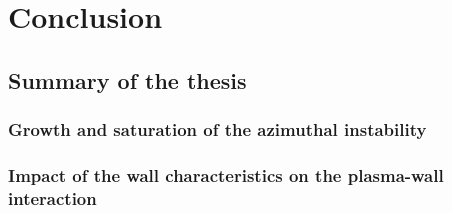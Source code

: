  
\clearpage
\ifodd\value{page}\else
  \thispagestyle{empty}
\fi
\chapter{Conclusion}
\label{ch-conclusion}


\section{Summary of the thesis}

  \lipsum[1-2]

  \subsection{Growth and saturation of the azimuthal instability}

    \lipsum[1-2]

  \subsection{Impact of the wall characteristics on the plasma-wall interaction }
  \lipsum[1-2]
